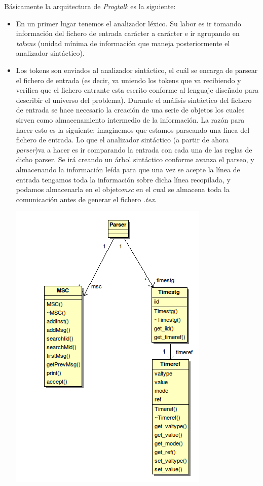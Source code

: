 Básicamente la arquitectura de \textit{Progtalk} es la siguiente:
\begin{itemize}
\item En un primer lugar tenemos el analizador léxico. Su labor es ir
  tomando información del fichero de entrada carácter a carácter e ir
  agrupando en \textit{tokens} (unidad mínima de información que
  maneja posteriormente el analizador sintáctico).
\item Los tokens son enviados al analizador sintáctico, el cuál se
  encarga de parsear el fichero de entrada (es decir, va uniendo los
  tokens que va recibiendo y verifica que el fichero entrante esta
  escrito conforme al lenguaje diseñado para describir el universo del
  problema).  Durante el análisis sintáctico del fichero de entrada se
  hace necesario la creación de una serie de objetos los cuales sirven
  como almacenamiento intermedio de la información. La razón para
  hacer esto es la siguiente: imaginemos que estamos parseando una
  línea del fichero de entrada. Lo que el analizador sintáctico (a
  partir de ahora \textit{parser})va a hacer es ir comparando la
  entrada con cada una de las reglas de dicho parser. Se irá creando
  un árbol sintáctico conforme avanza el parseo, y almacenando la
  información leída para que una vez se acepte la línea de entrada
  tengamos toda la información sobre dicha línea recopilada, y podamos
  almacenarla en el objeto\textit{msc} en el cual se almacena toda la
  comunicación antes de generar el fichero \textit{.tex}.

\includegraphics[scale=0.5]{./images/fig3}


\end{itemize}
